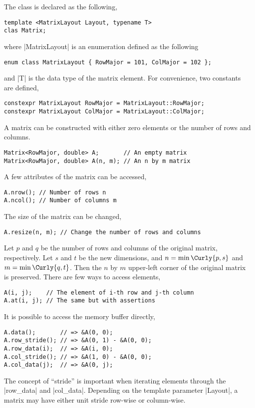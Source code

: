 The class is declared as the following,
\begin{verbatim}
template <MatrixLayout Layout, typename T>
clas Matrix;
\end{verbatim}
where |MatrixLayout| is an enumeration defined as the following
\begin{verbatim}
enum class MatrixLayout { RowMajor = 101, ColMajor = 102 };
\end{verbatim}
and |T| is the data type of the matrix element. For convenience, two constants
are defined,
\begin{verbatim}
constexpr MatrixLayout RowMajor = MatrixLayout::RowMajor;
constexpr MatrixLayout ColMajor = MatrixLayout::ColMajor;
\end{verbatim}

A matrix can be constructed with either zero elements or the number of rows and
columns.
\begin{verbatim}
Matrix<RowMajor, double> A;       // An empty matrix
Matrix<RowMajor, double> A(n, m); // An n by m matrix
\end{verbatim}
A few attributes of the matrix can be accessed,
\begin{verbatim}
A.nrow(); // Number of rows n
A.ncol(); // Number of columns m
\end{verbatim}
The size of the matrix can be changed,
\begin{verbatim}
A.resize(n, m); // Change the number of rows and columns
\end{verbatim}
Let $p$ and $q$ be the number of rows and columns of the original matrix,
respectively. Let $s$ and $t$ be the new dimensions, and $n = \min\Curly{p, s}$
and $m = \min\Curly{q, t}$. Then the $n$ by $m$ upper-left corner of the
original matrix is preserved. There are few ways to access elements,
\begin{verbatim}
A(i, j);    // The element of i-th row and j-th column
A.at(i, j); // The same but with assertions
\end{verbatim}
It is possible to access the memory buffer directly,
\begin{verbatim}
A.data();       // => &A(0, 0);
A.row_stride(); // => &A(0, 1) - &A(0, 0);
A.row_data(i);  // => &A(i, 0);
A.col_stride(); // => &A(1, 0) - &A(0, 0);
A.col_data(j);  // => &A(0, j);
\end{verbatim}
The concept of ``stride'' is important when iterating elements through the
|row_data| and |col_data|. Depending on the template parameter |Layout|, a
matrix may have either unit stride row-wise or column-wise.

